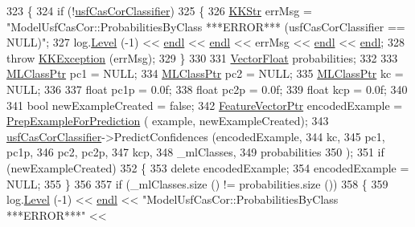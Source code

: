 \begin{DoxyCode}
323 \{
324   \textcolor{keywordflow}{if}  (!\hyperlink{class_k_k_m_l_l_1_1_model_usf_cas_cor_a7aeb7274e64e73ccfeea3a9da6633d60}{usfCasCorClassifier})
325   \{
326     \hyperlink{class_k_k_b_1_1_k_k_str}{KKStr} errMsg = \textcolor{stringliteral}{"ModelUsfCasCor::ProbabilitiesByClass   ***ERROR***      (usfCasCorClassifier ==
       NULL)"};
327     log.\hyperlink{class_k_k_b_1_1_run_log_a32cf761d7f2e747465fd80533fdbb659}{Level} (-1) << \hyperlink{namespace_k_k_b_ad1f50f65af6adc8fa9e6f62d007818a8}{endl} << \hyperlink{namespace_k_k_b_ad1f50f65af6adc8fa9e6f62d007818a8}{endl} << errMsg << \hyperlink{namespace_k_k_b_ad1f50f65af6adc8fa9e6f62d007818a8}{endl} << \hyperlink{namespace_k_k_b_ad1f50f65af6adc8fa9e6f62d007818a8}{endl};
328     \textcolor{keywordflow}{throw} \hyperlink{class_k_k_b_1_1_k_k_exception}{KKException} (errMsg);
329   \}
330 
331   \hyperlink{namespace_k_k_b_a4820c3670ee1fe74f0c4de981c600faf}{VectorFloat}  probabilities;
332 
333   \hyperlink{class_k_k_m_l_l_1_1_m_l_class}{MLClassPtr}  pc1 = NULL;
334   \hyperlink{class_k_k_m_l_l_1_1_m_l_class}{MLClassPtr}  pc2 = NULL;
335   \hyperlink{class_k_k_m_l_l_1_1_m_l_class}{MLClassPtr}  kc  = NULL;
336 
337   \textcolor{keywordtype}{float}  pc1p = 0.0f;
338   \textcolor{keywordtype}{float}  pc2p = 0.0f;
339   \textcolor{keywordtype}{float}  kcp = 0.0f;
340 
341   \textcolor{keywordtype}{bool}  newExampleCreated = \textcolor{keyword}{false};
342   \hyperlink{class_k_k_m_l_l_1_1_feature_vector}{FeatureVectorPtr}  encodedExample = \hyperlink{class_k_k_m_l_l_1_1_model_a31b972adfb64769b3ae966debec824fd}{PrepExampleForPrediction} (
      example, newExampleCreated);
343   \hyperlink{class_k_k_m_l_l_1_1_model_usf_cas_cor_a7aeb7274e64e73ccfeea3a9da6633d60}{usfCasCorClassifier}->PredictConfidences (encodedExample,
344                                            kc,
345                                            pc1, pc1p, 
346                                            pc2, pc2p,
347                                            kcp,
348                                            \_mlClasses,
349                                            probabilities
350                                           );
351   \textcolor{keywordflow}{if}  (newExampleCreated)
352   \{
353     \textcolor{keyword}{delete} encodedExample;
354     encodedExample = NULL;
355   \}
356 
357   \textcolor{keywordflow}{if}  (\_mlClasses.size () != probabilities.size ())
358   \{
359     log.\hyperlink{class_k_k_b_1_1_run_log_a32cf761d7f2e747465fd80533fdbb659}{Level} (-1) << \hyperlink{namespace_k_k_b_ad1f50f65af6adc8fa9e6f62d007818a8}{endl} << \textcolor{stringliteral}{"ModelUsfCasCor::ProbabilitiesByClass   ***ERROR***"}  << 

\end{DoxyCode}
